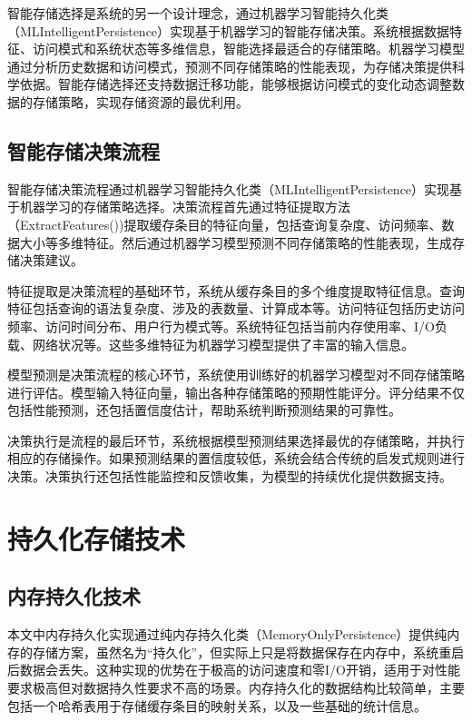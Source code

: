智能存储选择是系统的另一个设计理念，通过机器学习智能持久化类（MLIntelligentPersistence）实现基于机器学习的智能存储决策。系统根据数据特征、访问模式和系统状态等多维信息，智能选择最适合的存储策略。机器学习模型通过分析历史数据和访问模式，预测不同存储策略的性能表现，为存储决策提供科学依据。智能存储选择还支持数据迁移功能，能够根据访问模式的变化动态调整数据的存储策略，实现存储资源的最优利用。

\subsection{智能存储决策流程}

智能存储决策流程通过机器学习智能持久化类（MLIntelligentPersistence）实现基于机器学习的存储策略选择。决策流程首先通过特征提取方法（ExtractFeatures())提取缓存条目的特征向量，包括查询复杂度、访问频率、数据大小等多维特征。然后通过机器学习模型预测不同存储策略的性能表现，生成存储决策建议。

特征提取是决策流程的基础环节，系统从缓存条目的多个维度提取特征信息。查询特征包括查询的语法复杂度、涉及的表数量、计算成本等。访问特征包括历史访问频率、访问时间分布、用户行为模式等。系统特征包括当前内存使用率、I/O负载、网络状况等。这些多维特征为机器学习模型提供了丰富的输入信息。

模型预测是决策流程的核心环节，系统使用训练好的机器学习模型对不同存储策略进行评估。模型输入特征向量，输出各种存储策略的预期性能评分。评分结果不仅包括性能预测，还包括置信度估计，帮助系统判断预测结果的可靠性。

决策执行是流程的最后环节，系统根据模型预测结果选择最优的存储策略，并执行相应的存储操作。如果预测结果的置信度较低，系统会结合传统的启发式规则进行决策。决策执行还包括性能监控和反馈收集，为模型的持续优化提供数据支持。

\section{持久化存储技术}

\subsection{内存持久化技术}

本文中内存持久化实现通过纯内存持久化类（MemoryOnlyPersistence）提供纯内存的存储方案，虽然名为“持久化”，但实际上只是将数据保存在内存中，系统重启后数据会丢失。这种实现的优势在于极高的访问速度和零I/O开销，适用于对性能要求极高但对数据持久性要求不高的场景。内存持久化的数据结构比较简单，主要包括一个哈希表用于存储缓存条目的映射关系，以及一些基础的统计信息。

